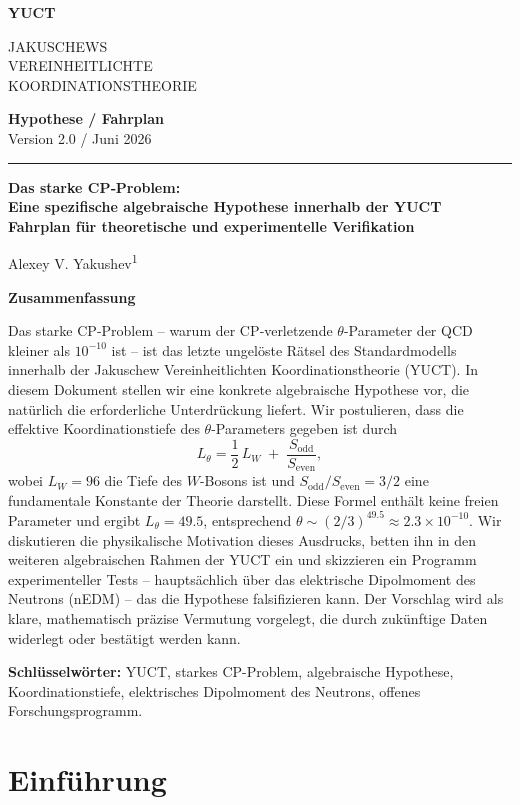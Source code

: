 \documentclass[12pt,a4paper]{article}
\newcommand{\makeheader}{%
	\noindent
	\begin{minipage}{0.17\textwidth}
		\raggedright
		{\sffamily\bfseries\color{skyblue}\fontsize{46}{46}\selectfont YUCT}%
	\end{minipage}%
	\hspace{30pt}
	\begin{minipage}{0.32\textwidth}
		\raggedright
		{\sffamily\fontsize{11}{13}\selectfont JAKUSCHEWS\\ VEREINHEITLICHTE\\ KOORDINATIONSTHEORIE}%
	\end{minipage}%
	\hfill
	\begin{minipage}{0.38\textwidth}
		\raggedleft
		{\sffamily\bfseries Hypothese / Fahrplan}\\ 
		{\sffamily Version 2.0 / Juni 2026}\\ 
	\end{minipage}
	\par\vspace{5pt}
	\noindent\textcolor{gold}{\rule{\textwidth}{1.6pt}}
	\par\vspace{0pt}
}
\begin{document}
	\thispagestyle{firstpage}
	\makeheader
	
	\vspace{0cm}
	{\LARGE\bfseries Das starke CP‑Problem:\\[0.1cm] Eine spezifische algebraische Hypothese innerhalb der YUCT\\[0.2cm] \Large Fahrplan für theoretische und experimentelle Verifikation \par}
	\vspace{0.2cm}
	
	{\large Alexey V. Yakushev\textsuperscript{1}} \\
	\vspace{0.0cm}
	
	{\color{darkblue}\textbf{\LARGE Zusammenfassung}} \par
	{\large
		\noindent
		Das starke CP‑Problem – warum der CP‑verletzende \(\theta\)-Parameter der QCD kleiner als \(10^{-10}\) ist – ist das letzte ungelöste Rätsel des Standardmodells innerhalb der Jakuschew Vereinheitlichten Koordinationstheorie (YUCT). In diesem Dokument stellen wir eine konkrete algebraische Hypothese vor, die natürlich die erforderliche Unterdrückung liefert. Wir postulieren, dass die effektive Koordinationstiefe des \(\theta\)-Parameters gegeben ist durch
		\[
		L_\theta = \frac{1}{2}\,L_W \;+\; \frac{S_{\mathrm{odd}}}{S_{\mathrm{even}}},
		\]
		wobei \(L_W = 96\) die Tiefe des \(W\)-Bosons ist und \(S_{\mathrm{odd}}/S_{\mathrm{even}} = 3/2\) eine fundamentale Konstante der Theorie darstellt. Diese Formel enthält keine freien Parameter und ergibt \(L_\theta = 49.5\), entsprechend \(\theta \sim (2/3)^{49.5} \approx 2.3 \times 10^{-10}\). Wir diskutieren die physikalische Motivation dieses Ausdrucks, betten ihn in den weiteren algebraischen Rahmen der YUCT ein und skizzieren ein Programm experimenteller Tests – hauptsächlich über das elektrische Dipolmoment des Neutrons (nEDM) – das die Hypothese falsifizieren kann. Der Vorschlag wird als klare, mathematisch präzise Vermutung vorgelegt, die durch zukünftige Daten widerlegt oder bestätigt werden kann.
	}
	
	\vspace{0.1cm}
	\noindent
	{\color{darkblue}\textbf{Schlüsselwörter:}} YUCT, starkes CP-Problem, algebraische Hypothese, Koordinationstiefe, elektrisches Dipolmoment des Neutrons, offenes Forschungsprogramm.
	\vspace{0.4cm}
	
	\clearpage
	\tableofcontents
	\newpage
	
	\section{Einführung}
	\label{sec:intro}
	
\end{document}

